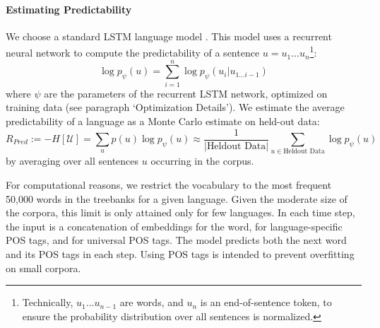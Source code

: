 \documentclass[10pt,twoside,lineno]{article}
\newcommand{\utterance}{\mathcal{U}}
\newcommand{\tree}{\mathcal{T}}
\begin{document}
\paragraph{Estimating Predictability}
We choose a standard LSTM language model \citep{goldberg2017neural, hochreiter1997long}. This model uses a recurrent neural network to compute the predictability of a sentence $u = u_1...u_n$\footnote{Technically, $u_1...u_{n-1}$ are words, and $u_n$ is an end-of-sentence token, to ensure the probability distribution over all sentences is normalized.}:
\begin{equation}
\log p_\psi(u) = \sum_{i=1}^n \log p_\psi(u_i|u_{1\dots i-1})
\end{equation}
where $\psi$ are the parameters of the recurrent LSTM network, optimized on training data (see paragraph `Optimization Details').
We estimate the average predictability of a language as a Monte Carlo estimate on held-out data:
\begin{equation}
	R_{Pred} := - H[\utterance] = \sum_{u} p(u) \log p_\psi(u) \approx \frac{1}{|\text{Heldout Data}|} \sum_{u \in \text{Heldout Data}} \log p_\psi(u)
\end{equation}
by averaging over all sentences $u$ occurring in the corpus.

For computational reasons, we restrict the vocabulary to the most frequent 50,000 words in the treebanks for a given language.
Given the moderate size of the corpora, this limit is only attained only for few languages.
In each time step, the input is a concatenation of embeddings for the word, for language-specific POS tags, and for universal POS tags.
The model predicts both the next word and its POS tags in each step.
Using POS tags is intended to prevent overfitting on small corpora.

\end{document}
